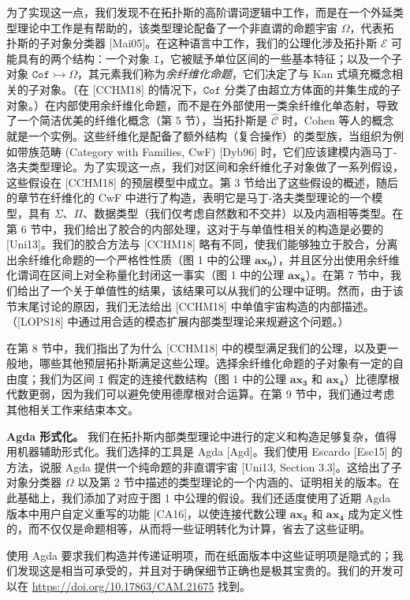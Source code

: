 \documentclass{ctexart}
\theoremstyle{plain}
\theoremstyle{definition}
\theoremstyle{definition}
\theoremstyle{definition}
\theoremstyle{definition}
\newcommand\ttI{\mathtt{I}}
\newcommand{\ax}[1]{\mathbf{ax_{#1}}}
\numberwithin{equation}{section}
\begin{document}
为了实现这一点，我们发现不在拓扑斯的高阶谓词逻辑中工作，而是在一个外延类型理论中工作是有帮助的，该类型理论配备了一个非直谓的命题宇宙 $\Omega$，代表拓扑斯的子对象分类器 [Mai05]。在这种语言中工作，我们的公理化涉及拓扑斯 $\mathcal{E}$ 可能具有的两个结构：一个对象 $\ttI$，它被赋予单位区间的一些基本特征；以及一个子对象 $\mathtt{Cof} \rightarrowtail \Omega$，其元素我们称为\textit{余纤维化命题}，它们决定了与 Kan 式填充概念相关的子对象。（在 [CCHM18] 的情况下，$\mathtt{Cof}$ 分类了由超立方体面的并集生成的子对象。）在内部使用余纤维化命题，而不是在外部使用一类余纤维化单态射，导致了一个简洁优美的纤维化概念（第 5 节），当拓扑斯是 $\hat{\mathcal{C}}$ 时，Cohen 等人的概念就是一个实例。这些纤维化是配备了额外结构（复合操作）的类型族，当组织为例如带族范畴 (Category with Families, CwF) [Dyb96] 时，它们应该建模内涵马丁-洛夫类型理论。为了实现这一点，我们对区间和余纤维化子对象做了一系列假设，这些假设在 [CCHM18] 的预层模型中成立。第 3 节给出了这些假设的概述，随后的章节在纤维化的 CwF 中进行了构造，表明它是马丁-洛夫类型理论的一个模型，具有 $\Sigma$、$\Pi$、数据类型（我们仅考虑自然数和不交并）以及内涵相等类型。在第 6 节中，我们给出了胶合的内部处理，这对于与单值性相关的构造是必要的 [Uni13]。我们的胶合方法与 [CCHM18] 略有不同，使我们能够独立于胶合，分离出余纤维化命题的一个严格性性质（图 1 中的公理 $\ax{9}$），并且区分出使用余纤维化谓词在区间上对全称量化封闭这一事实（图 1 中的公理 $\ax{8}$）。在第 7 节中，我们给出了一个关于单值性的结果，该结果可以从我们的公理中证明。然而，由于该节末尾讨论的原因，我们无法给出 [CCHM18] 中单值宇宙构造的内部描述。（[LOPS18] 中通过用合适的模态扩展内部类型理论来规避这个问题。）

在第 8 节中，我们指出了为什么 [CCHM18] 中的模型满足我们的公理，以及更一般地，哪些其他预层拓扑斯满足这些公理。选择余纤维化命题的子对象有一定的自由度；我们为区间 $\ttI$ 假定的连接代数结构（图 1 中的公理 $\ax{3}$ 和 $\ax{4}$）比德摩根代数更弱，因为我们可以避免使用德摩根对合运算。在第 9 节中，我们通过考虑其他相关工作来结束本文。

\textbf{Agda 形式化。} 我们在拓扑斯内部类型理论中进行的定义和构造足够复杂，值得用机器辅助形式化。我们选择的工具是 Agda [Agd]。我们使用 Escardo [Esc15] 的方法，说服 Agda 提供一个纯命题的非直谓宇宙 [Uni13, Section 3.3]。这给出了子对象分类器 $\Omega$ 以及第 2 节中描述的类型理论的一个内涵的、证明相关的版本。在此基础上，我们添加了对应于图 1 中公理的假设。我们还适度使用了近期 Agda 版本中用户自定义重写的功能 [CA16]，以使连接代数公理 $\ax{3}$ 和 $\ax{4}$ 成为定义性的，而不仅仅是命题相等，从而将一些证明转化为计算，省去了这些证明。

使用 Agda 要求我们构造并传递证明项，而在纸面版本中这些证明项是隐式的；我们发现这是相当可承受的，并且对于确保细节正确也是极其宝贵的。我们的开发可以在 \href{https://doi.org/10.17863/CAM.21675}{https://doi.org/10.17863/CAM.21675} 找到。
\end{document}
